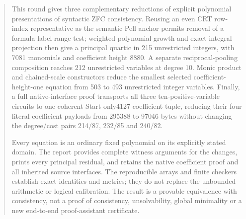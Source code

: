 \begin{abstract}
This round gives three complementary reductions of explicit polynomial
presentations of syntactic ZFC consistency. Reusing an even CRT row-index
representative as the semantic Pell anchor permits removal of a formula-label
range test; weighted polynomial growth and exact integral projection then
give a principal quartic in 215 unrestricted integers, with 7081 monomials
and coefficient height 8880. A separate reciprocal-pooling composition
reaches 212 unrestricted variables at degree 10. Monic product and chained-scale
constructors reduce the smallest selected coefficient-height-one equation
from 503 to 493 unrestricted integer variables. Finally, a full native-interface
proof transports all three ten-positive-variable circuits to one coherent
Start-only4127 coefficient tuple, reducing their four literal coefficient
payloads from 295388 to 97046 bytes without changing the degree/cost pairs
214/87, 232/85 and 240/82.

Every equation is an ordinary fixed polynomial on its explicitly stated
domain. The report provides complete witness arguments for the changes,
prints every principal residual, and retains the native coefficient proof
and all inherited source interfaces. The reproducible arrays and finite
checkers establish exact identities and metrics; they do not replace the
unbounded arithmetic or logical calibration. The result is a provable
equivalence with consistency, not a proof of consistency, unsolvability,
global minimality or a new end-to-end proof-assistant certificate.
\end{abstract}

